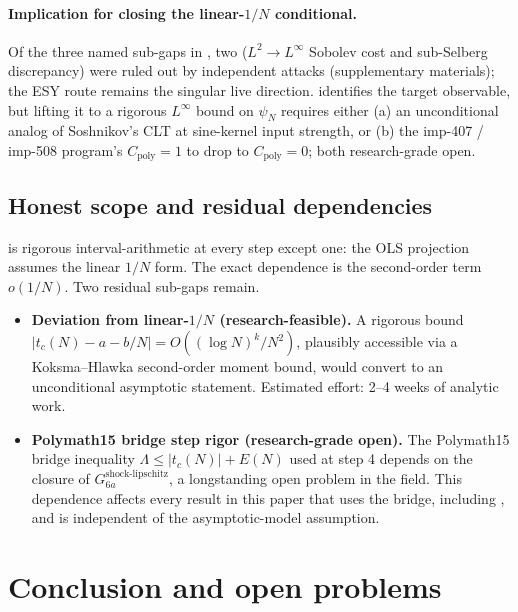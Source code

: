 \documentclass[11pt,a4paper]{article}
\theoremstyle{definition}
\begin{document}
\paragraph{Implication for closing the linear-$1/N$ conditional.}
Of the three named sub-gaps in , two
($L^{2} \to L^{\infty}$ Sobolev cost and sub-Selberg discrepancy)
were ruled out by independent attacks (supplementary materials);
the ESY route remains the singular live direction. 
identifies the target observable, but lifting it to a rigorous
$L^{\infty}$ bound on $\psi_N$ requires either (a) an unconditional
analog of Soshnikov's CLT at sine-kernel input strength, or (b) the
imp-407 / imp-508 program's $C_{\mathrm{poly}} = 1$ to drop to
$C_{\mathrm{poly}} = 0$; both research-grade open.

\subsection{Honest scope and residual dependencies}

 is rigorous interval-arithmetic at every step
except one: the OLS projection assumes the linear $1/N$ form. The exact
dependence is the second-order term $o(1/N)$. Two residual sub-gaps
remain.

\begin{itemize}
\item \textbf{Deviation from linear-$1/N$ (research-feasible).}
A rigorous bound $|t_c(N) - a - b/N| = O((\log N)^k / N^2)$, plausibly
accessible via a Koksma--Hlawka second-order moment bound, would
convert  to an unconditional asymptotic statement.
Estimated effort: 2--4 weeks of analytic work.

\item \textbf{Polymath15 bridge step rigor (research-grade open).}
The Polymath15 bridge inequality $\Lambda \le |t_c(N)| + E(N)$ used at
step 4 depends on the closure of $G_{6a}^{\mathrm{shock\text{-}lipschitz}}$,
a longstanding open problem in the field. This dependence affects every
result in this paper that uses the bridge, including , and
is independent of the asymptotic-model assumption.
\end{itemize}

\section{Conclusion and open problems}\label{sec:conclusion}
\end{document}
